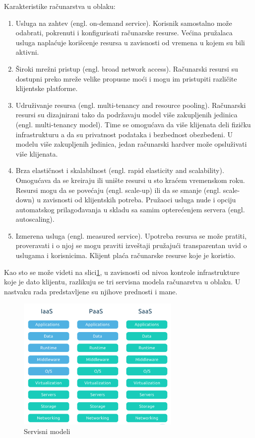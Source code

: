 \documentclass[12pt,oneside]{memoir}
\begin{document}
Karakteristike računarstva u oblaku:
\begin{enumerate}
  \item Usluga na zahtev (engl. on-demand service). Korisnik samostalno može odabrati, pokrenuti i konfigurisati računarske resurse. Većina pružalaca usluga naplaćuje korišcenje resursa u zavisnosti od vremena u kojem su bili aktivni.
  \item Široki mrežni pristup (engl. broad network access). Računarski resursi su dostupni preko mreže velike propusne moći i mogu im pristupiti različite klijentske platforme.
  \item Udruživanje resursa (engl. multi-tenancy and resource pooling). Računarski resursi su dizajnirani tako da podržavaju model više zakupljenih jedinica (engl. multi-tenancy model). Time se omogućava da više klijenata deli fizičku infrastrukturu a da su privatnost podataka i bezbednost obezbeđeni. U modelu više zakupljenih jedinica, jedan računarski hardver može opsluživati više klijenata.
  \item Brza elastičnost i skalabilnost (engl. rapid elasticity and scalability). Omogućava da se kreiraju ili unište resursi u sto kraćem vremenskom roku. Resursi mogu da se povećaju (engl. scale-up) ili da se smanje (engl. scale-down) u zavisnosti od klijentskih potreba. Pružaoci usluga nude i opciju automatskog prilagođavanja u skladu sa samim opterećenjem servera (engl. autoscaling).
  \item Izmerena usluga (engl. measured service). Upotreba resursa se može pratiti, proveravati i o njoj se mogu praviti izveštaji pružajući transparentan uvid o uslugama i korisnicima. Klijent plaća računarske resurse koje je koristio.
\end{enumerate}

Kao sto se može videti na slici\ref{fig:servisniModeli}, u zavisnosti od nivoa kontrole infrastrukture koje je dato klijentu, razlikuju se tri servisna modela računarstva u oblaku. U nastvaku rada predstavljene su njihove prednosti i mane.

\begin{figure}[!ht]
  \centering
  \includegraphics[width=0.7\textwidth]{Slika 5.png}
  \caption{Servisni modeli}
  \label{fig:servisniModeli}
\end{figure}
 
\end{document}

